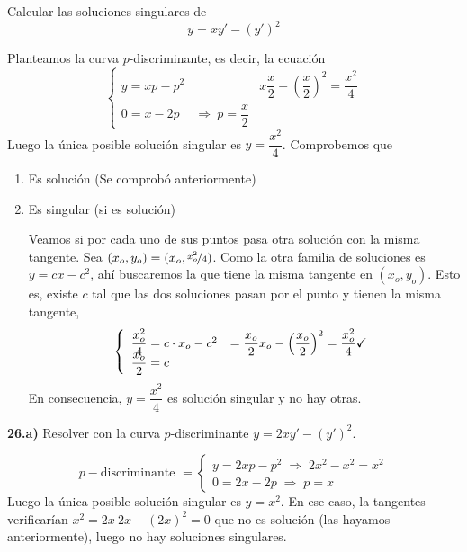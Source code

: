 \begin{ejer}
    Calcular las soluciones singulares de 
    $$y=xy'-(y')^2$$
\end{ejer}
\begin{sol}
    Planteamos la curva $p$-discriminante, es decir, la ecuación
    $$\left\{\begin{array}{lll}
         y=xp-p^2  & & x \dfrac{x}{2}-\left(\dfrac{x}{2}\right)^2=\dfrac{x^2}{4}\\
         0=x-2p \; & \Rightarrow \: p=\dfrac{x}{2} & 
    \end{array} \right.$$
    Luego la única posible solución singular es $y=\dfrac{x^2}{4}$. Comprobemos que 
    \begin{enumerate}
        \item Es solución (Se comprobó anteriormente)
        \item Es singular (si es solución)

        Veamos si por cada uno de sus puntos pasa otra solución con la misma tangente. Sea $(x_o,y_o)=(x_o,\nicefrac{x_o^2}{4})$. Como la otra familia de soluciones es $y=cx-c^2$, ahí buscaremos la que tiene la misma tangente en $(x_o,y_o)$. Esto es, existe $c$ tal que las dos soluciones pasan por el punto y tienen la misma tangente, 
     $$\left\{ \begin{array}{ll}
          \dfrac{x_o^2}{4}=c \cdot x_o-c^2 & = \dfrac{x_o}{2}x_o-\left(\dfrac{x_o}{2}\right)^2=\dfrac{x_o^2}{4} \checkmark \\
          \vspace{-5mm} \\
          \dfrac{x_o}{2}=c
     \end{array}\right.$$
     En consecuencia, $y=\dfrac{x^2}{4}$ es solución singular y no hay otras.
    \end{enumerate}
\end{sol}
\begin{ejer}
    \textbf{26.a)} Resolver con la curva $p$-discriminante $y=2xy'-(y')^2$.
\end{ejer}
\begin{sol}
    $$p-\text{discriminante } = \left\{ \begin{array}{l}
         y=2xp-p^2 \; \Rightarrow \; 2x^2-x^2=x^2   \\
         0=2x-2p \; \Rightarrow \; p=x
    \end{array}\right.$$
    Luego la única posible solución singular es $y=x^2$. En ese caso, la tangentes verificarían $x^2=2x \: 2x-(2x)^2=0$ que no es solución (las hayamos anteriormente), luego no hay soluciones singulares.
\end{sol}
